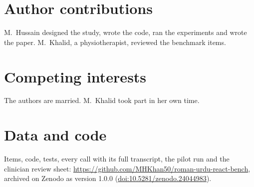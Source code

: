 \documentclass[11pt]{article}
\begin{document}
\section*{Author contributions}
M.\ Hussain designed the study, wrote the code, ran the experiments and wrote the paper. M.\ Khalid, a physiotherapist, reviewed the benchmark items.

\section*{Competing interests}
The authors are married. M.\ Khalid took part in her own time.

\section*{Data and code}
Items, code, tests, every call with its full transcript, the pilot run and the clinician review sheet: \url{https://github.com/MHKhan50/roman-urdu-react-bench}, archived on Zenodo as version 1.0.0 (\href{https://doi.org/10.5281/zenodo.24044983}{doi:10.5281/zenodo.24044983}).



\end{document}
